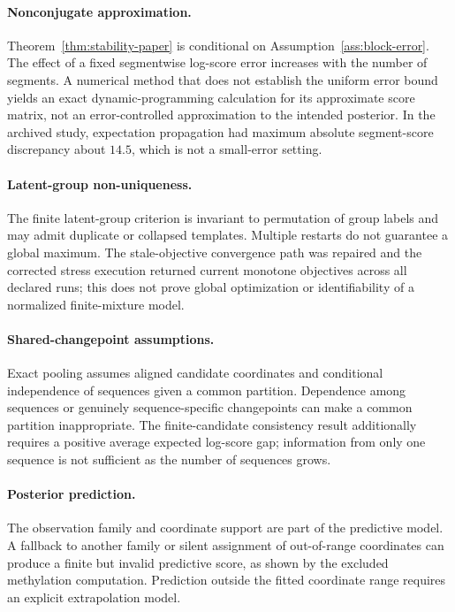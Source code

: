 \paragraph{Nonconjugate approximation.}
Theorem~\ref{thm:stability-paper} is conditional on Assumption~\ref{ass:block-error}. The effect of a fixed segmentwise log-score error increases with the number of segments. A numerical method that does not establish the uniform error bound yields an exact dynamic-programming calculation for its approximate score matrix, not an error-controlled approximation to the intended posterior. In the archived study, expectation propagation had maximum absolute segment-score discrepancy about $14.5$, which is not a small-error setting.

\paragraph{Latent-group non-uniqueness.}
The finite latent-group criterion is invariant to permutation of group labels and may admit duplicate or collapsed templates. Multiple restarts do not guarantee a global maximum. The stale-objective convergence path was repaired and the corrected stress execution  returned current monotone objectives across all declared runs; this does not prove global optimization or identifiability of a normalized finite-mixture model.

\paragraph{Shared-changepoint assumptions.}
Exact pooling assumes aligned candidate coordinates and conditional independence of sequences given a common partition. Dependence among sequences or genuinely sequence-specific changepoints can make a common partition inappropriate. The finite-candidate consistency result additionally requires a positive average expected log-score gap; information from only one sequence is not sufficient as the number of sequences grows.

\paragraph{Posterior prediction.}
The observation family and coordinate support are part of the predictive model. A fallback to another family or silent assignment of out-of-range coordinates can produce a finite but invalid predictive score, as shown by the excluded methylation computation. Prediction outside the fitted coordinate range requires an explicit extrapolation model.

